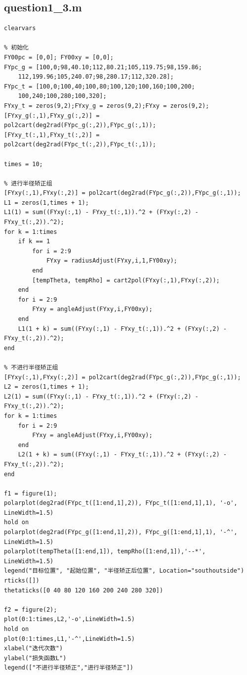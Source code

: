 \documentclass[12pt,AutoFakeSlant,AutoFakeBold]{article}
\begin{document}
\subsection{question1\_3.m}
\begin{verbatim}
clearvars

% 初始化
FY00pc = [0,0]; FY00xy = [0,0];
FYpc_g = [100,0;98,40.10;112,80.21;105,119.75;98,159.86;
    112,199.96;105,240.07;98,280.17;112,320.28];
FYpc_t = [100,0;100,40;100,80;100,120;100,160;100,200;
    100,240;100,280;100,320];
FYxy_t = zeros(9,2);FYxy_g = zeros(9,2);FYxy = zeros(9,2);
[FYxy_g(:,1),FYxy_g(:,2)] = pol2cart(deg2rad(FYpc_g(:,2)),FYpc_g(:,1));
[FYxy_t(:,1),FYxy_t(:,2)] = pol2cart(deg2rad(FYpc_t(:,2)),FYpc_t(:,1));

times = 10;

% 进行半径矫正组
[FYxy(:,1),FYxy(:,2)] = pol2cart(deg2rad(FYpc_g(:,2)),FYpc_g(:,1));
L1 = zeros(1,times + 1);
L1(1) = sum((FYxy(:,1) - FYxy_t(:,1)).^2 + (FYxy(:,2) - FYxy_t(:,2)).^2);
for k = 1:times
    if k == 1
        for i = 2:9
            FYxy = radiusAdjust(FYxy,i,1,FY00xy);
        end
        [tempTheta, tempRho] = cart2pol(FYxy(:,1),FYxy(:,2));
    end
    for i = 2:9
        FYxy = angleAdjust(FYxy,i,FY00xy);
    end
    L1(1 + k) = sum((FYxy(:,1) - FYxy_t(:,1)).^2 + (FYxy(:,2) - FYxy_t(:,2)).^2);
end

% 不进行半径矫正组
[FYxy(:,1),FYxy(:,2)] = pol2cart(deg2rad(FYpc_g(:,2)),FYpc_g(:,1));
L2 = zeros(1,times + 1);
L2(1) = sum((FYxy(:,1) - FYxy_t(:,1)).^2 + (FYxy(:,2) - FYxy_t(:,2)).^2);
for k = 1:times
    for i = 2:9
        FYxy = angleAdjust(FYxy,i,FY00xy);
    end
    L2(1 + k) = sum((FYxy(:,1) - FYxy_t(:,1)).^2 + (FYxy(:,2) - FYxy_t(:,2)).^2);
end

f1 = figure(1);
polarplot(deg2rad(FYpc_t([1:end,1],2)), FYpc_t([1:end,1],1), '-o', LineWidth=1.5)
hold on
polarplot(deg2rad(FYpc_g([1:end,1],2)), FYpc_g([1:end,1],1), '-^', LineWidth=1.5)
polarplot(tempTheta([1:end,1]), tempRho([1:end,1]),'--*', LineWidth=1.5)
legend("目标位置", "起始位置", "半径矫正后位置", Location="southoutside")
rticks([])
thetaticks([0 40 80 120 160 200 240 280 320])

f2 = figure(2);
plot(0:1:times,L2,'-o',LineWidth=1.5)
hold on
plot(0:1:times,L1,'-^',LineWidth=1.5)
xlabel("迭代次数")
ylabel("损失函数L")
legend(["不进行半径矫正","进行半径矫正"])
\end{verbatim}
\end{document}
